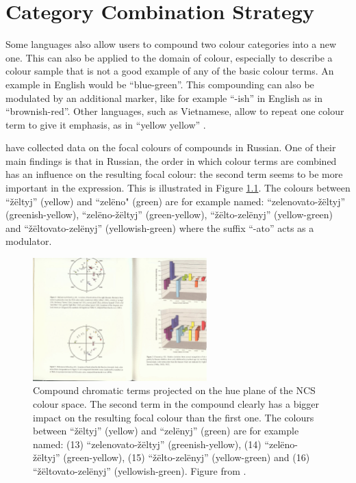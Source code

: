 \chapter{Category Combination Strategy}
\label{s:category-combination-strategy}

Some languages also allow users to compound two colour categories into
a new one. This can also be applied to the domain of colour,
especially to describe a colour sample that is not a good example of
any of the basic colour terms.  An example in English would be
``blue-green''. This compounding can also be modulated by an
additional marker, like for example ``-ish'' in English as in
``brownish-red''. Other languages, such as Vietnamese, allow to repeat
one colour term to give it emphasis, as in ``yellow yellow''
\citep{alvarado02modifying}.

\cite{safuanova07russian} have collected data on the focal colours of
compounds in Russian. One of their main findings is that in Russian,
the order in which colour terms are combined has an influence on the
resulting focal colour: the second term seems to be more important in
the expression. This is illustrated in Figure \ref{f:ccs-russian}. The
colours between ``\v z\"eltyj'' (yellow) and ``zel\"eno" (green) are
for example named: ``zelenovato-\v z\"eltyj'' (greenish-yellow),
``zel\"eno-\v z\"eltyj'' (green-yellow), ``\v z\"elto-zel\"enyj''
(yellow-green) and ``\v z\"eltovato-zel\"enyj'' (yellowish-green)
where the suffix ``-ato'' acts as a modulator.

\begin{figure}[htbp]
  \begin{center}
    \includegraphics[width=0.6\textwidth]{./category-combination/figures/russian-combination.pdf}
    \caption[Compound chromatic terms in Russian]{Compound chromatic
      terms projected on the hue plane of the NCS colour space. The
      second term in the compound clearly has a bigger impact on the
      resulting focal colour than the first one. The colours between
      ``\v z\"eltyj'' (yellow) and ``zel\"enyj'' (green) are for
      example named: (13) ``zelenovato-\v z\"eltyj''
      (greenish-yellow), (14) ``zel\"eno-\v z\"eltyj'' (green-yellow),
      (15) ``\v z\"elto-zel\"enyj'' (yellow-green) and (16) ``\v
      z\"eltovato-zel\"enyj'' (yellowish-green). Figure from
      \cite{safuanova07russian}.}
    \label{f:ccs-russian}
  \end{center}
\end{figure}


